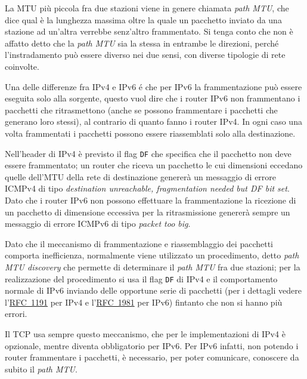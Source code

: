 

La MTU più piccola fra due stazioni viene in genere chiamata \textit{path
  MTU}, che dice qual è la lunghezza massima oltre la quale un pacchetto
inviato da una stazione ad un'altra verrebbe senz'altro frammentato. Si tenga
conto che non è affatto detto che la \textit{path MTU} sia la stessa in
entrambe le direzioni, perché l'instradamento può essere diverso nei due
sensi, con diverse tipologie di rete coinvolte.

Una delle differenze fra IPv4 e IPv6 é che per IPv6 la frammentazione può
essere eseguita solo alla sorgente, questo vuol dire che i router IPv6 non
frammentano i pacchetti che ritrasmettono (anche se possono frammentare i
pacchetti che generano loro stessi), al contrario di quanto fanno i router
IPv4. In ogni caso una volta frammentati i pacchetti possono essere
riassemblati solo alla destinazione.

Nell'header di IPv4 è previsto il flag \texttt{DF} che specifica che il
pacchetto non deve essere frammentato; un router che riceva un pacchetto le
cui dimensioni eccedano quelle dell'MTU della rete di destinazione genererà un
messaggio di errore ICMPv4 di tipo \textit{destination unreachable,
  fragmentation needed but DF bit set}.  Dato che i router IPv6 non possono
effettuare la frammentazione la ricezione di un pacchetto di dimensione
eccessiva per la ritrasmissione genererà sempre un messaggio di errore ICMPv6
di tipo \textit{packet too big}.

Dato che il meccanismo di frammentazione e riassemblaggio dei pacchetti
comporta inefficienza, normalmente viene utilizzato un procedimento, detto
\textit{path MTU discovery} che permette di determinare il \textit{path MTU}
fra due stazioni; per la realizzazione del procedimento si usa il flag
\texttt{DF} di IPv4 e il comportamento normale di IPv6 inviando delle
opportune serie di pacchetti (per i dettagli vedere
l'\href{http://www.ietf.org/rfc/rfc1191.txt}{RFC~1191} per IPv4 e
l'\href{http://www.ietf.org/rfc/rfc1981.txt}{RFC~1981} per IPv6) fintanto che
non si hanno più errori.

Il TCP usa sempre questo meccanismo, che per le implementazioni di IPv4 è
opzionale, mentre diventa obbligatorio per IPv6.  Per IPv6 infatti, non
potendo i router frammentare i pacchetti, è necessario, per poter comunicare,
conoscere da subito il \textit{path MTU}.


